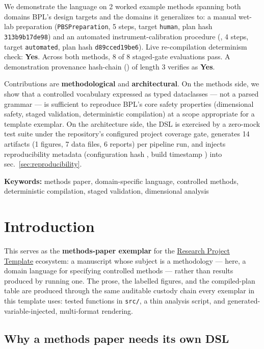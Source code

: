 \documentclass[
  english,
]{article}
\begin{document}
We demonstrate the language on 2 worked example methods spanning both
domains BPL's design targets and the domains it generalizes to: a manual
wet-lab preparation (\texttt{PBSPreparation}, 5 steps, target
\texttt{human}, plan hash \texttt{313b9b17de98}) and an automated
instrument-calibration procedure (, 4
steps, target \texttt{automated}, plan hash \texttt{d89cced19be6}). Live
re-compilation determinism check: \textbf{Yes}. Across both methods, 8
of 8 staged-gate evaluations pass. A demonstration provenance hash-chain
() of length 3 verifies as
\textbf{Yes}.

Contributions are \textbf{methodological} and \textbf{architectural}. On
the methods side, we show that a controlled vocabulary expressed as
typed dataclasses --- not a parsed grammar --- is sufficient to
reproduce BPL's core safety properties (dimensional safety, staged
validation, deterministic compilation) at a scope appropriate for a
template exemplar. On the architecture side, the DSL is exercised by a
zero-mock test suite under the repository's configured project coverage
gate, generates 14 artifacts (1 figures, 7 data files, 6 reports) per
pipeline run, and injects reproducibility metadata (configuration hash
, build timestamp
) into sec.~\ref{sec:reproducibility}.

\textbf{Keywords:} methods paper, domain-specific language, controlled
methods, deterministic compilation, staged validation, dimensional
analysis

\newpage

\section{Introduction}\label{sec:introduction}

This  serves as the
\textbf{methods-paper exemplar} for the
\href{https://github.com/docxology/template}{Research Project Template}
ecosystem: a manuscript whose subject is a methodology --- here, a
domain language for specifying controlled methods --- rather than
results produced by running one. The prose, the labelled figures, and
the compiled-plan table are produced through the same auditable custody
chain every exemplar in this template uses: tested functions in
\texttt{src/}, a thin analysis script, and generated-variable-injected,
multi-format rendering.

\subsection{Why a methods paper needs its own
DSL}\label{why-a-methods-paper-needs-its-own-dsl}
\end{document}
